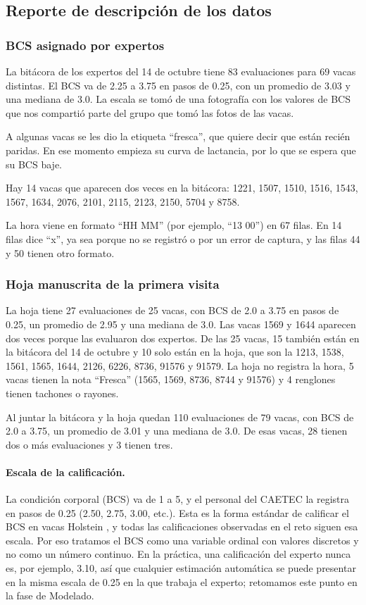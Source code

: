 \subsection{Reporte de descripción de los datos}

\subsubsection*{BCS asignado por expertos}

La bitácora de los expertos del 14 de octubre tiene 83 evaluaciones para 69 vacas distintas. El BCS va de 2.25 a 3.75 en pasos de 0.25, con un promedio de 3.03 y una mediana de 3.0. La escala se tomó de una fotografía con los valores de BCS que nos compartió parte del grupo que tomó las fotos de las vacas.

A algunas vacas se les dio la etiqueta ``fresca'', que quiere decir que están recién paridas. En ese momento empieza su curva de lactancia, por lo que se espera que su BCS baje.

Hay 14 vacas que aparecen dos veces en la bitácora: 1221, 1507, 1510, 1516, 1543, 1567, 1634, 2076, 2101, 2115, 2123, 2150, 5704 y 8758.

La hora viene en formato ``HH MM'' (por ejemplo, ``13 00'') en 67 filas. En 14 filas dice ``x'', ya sea porque no se registró o por un error de captura, y las filas 44 y 50 tienen otro formato.

\subsubsection*{Hoja manuscrita de la primera visita}

La hoja tiene 27 evaluaciones de 25 vacas, con BCS de 2.0 a 3.75 en pasos de 0.25, un promedio de 2.95 y una mediana de 3.0. Las vacas 1569 y 1644 aparecen dos veces porque las evaluaron dos expertos. De las 25 vacas, 15 también están en la bitácora del 14 de octubre y 10 solo están en la hoja, que son la 1213, 1538, 1561, 1565, 1644, 2126, 6226, 8736, 91576 y 91579. La hoja no registra la hora, 5 vacas tienen la nota ``Fresca'' (1565, 1569, 8736, 8744 y 91576) y 4 renglones tienen tachones o rayones.

Al juntar la bitácora y la hoja quedan 110 evaluaciones de 79 vacas, con BCS de 2.0 a 3.75, un promedio de 3.01 y una mediana de 3.0. De esas vacas, 28 tienen dos o más evaluaciones y 3 tienen tres.

\paragraph{Escala de la calificación.} La condición corporal (BCS) va de 1 a 5, y el personal del CAETEC la registra en pasos de 0.25 (2.50, 2.75, 3.00, etc.). Esta es la forma estándar de calificar el BCS en vacas Holstein \parencite{edmonson1989,ferguson1994}, y todas las calificaciones observadas en el reto siguen esa escala. Por eso tratamos el BCS como una variable ordinal con valores discretos y no como un número continuo. En la práctica, una calificación del experto nunca es, por ejemplo, 3.10, así que cualquier estimación automática se puede presentar en la misma escala de 0.25 en la que trabaja el experto; retomamos este punto en la fase de Modelado.

